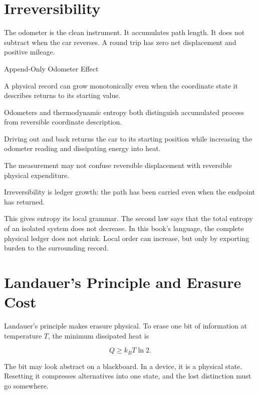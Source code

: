 
\section{Irreversibility}
\label{se:irreversibility}

The odometer is the clean instrument. It accumulates path length. It does not
subtract when the car reverses. A round trip has zero net displacement and
positive mileage.

\begin{phenom}{Append-Only Odometer Effect}
\label{ph:append-only-odometer-effect}

\PhStatement A physical record can grow monotonically even when the coordinate
state it describes returns to its starting value.

\PhOrigin Odometers and thermodynamic entropy both distinguish accumulated
process from reversible coordinate description.

\PhObservation Driving out and back returns the car to its starting position
while increasing the odometer reading and dissipating energy into heat.

\PhConstraint The measurement may not confuse reversible displacement with
reversible physical expenditure.

\PhConsequence Irreversibility is ledger growth: the path has been carried even
when the endpoint has returned.

\end{phenom}

This gives entropy its local grammar. The second law says that the total
entropy of an isolated system does not decrease. In this book's language, the
complete physical ledger does not shrink. Local order can increase, but only by
exporting burden to the surrounding record.

\section{Landauer's Principle and Erasure Cost}
\label{se:landauers-principle-and-erasure-cost}

Landauer's principle makes erasure physical. To erase one bit of information at
temperature $T$, the minimum dissipated heat is

\[
Q \geq k_B T \ln 2.
\label{eq:chapter11-landauer}
\]

The bit may look abstract on a blackboard. In a device, it is a physical state.
Resetting it compresses alternatives into one state, and the lost distinction
must go somewhere.

